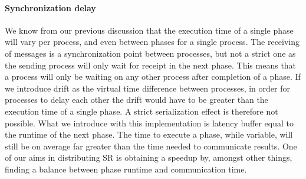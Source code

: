 \paragraph{Synchronization delay}
We know from our previous discussion that the execution time of a single phase will vary per process, and even between phases for a single process. The receiving of messages is a synchronization point between processes, but not a strict one as the sending process will only wait for receipt in the next phase. This means that a process will only be waiting on any other process after completion of a phase. If we introduce drift as the virtual time difference between processes, in order for processes to delay each other the drift would have to be greater than the execution time of a single phase. A strict serialization effect is therefore not possible. What we introduce with this implementation is latency buffer equal to the runtime of the next phase. The time to execute a phase, while variable, will still be on average far greater than the time needed to communicate results. One of our aims in distributing SR is obtaining a speedup by, amongst other things, finding a balance between phase runtime and communication time.

